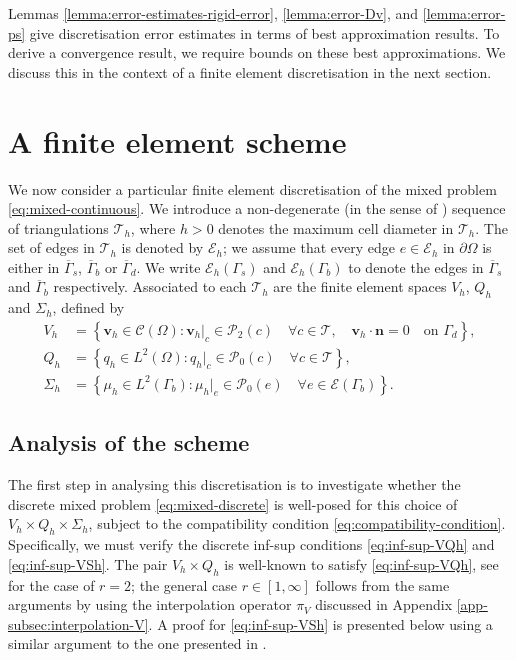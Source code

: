 \documentclass[onefignum,onetabnum]{siamart190516}
\newcommand{\bn}{\boldsymbol{n}}
\newcommand{\bv}{\boldsymbol{v}}
\newcommand{\bCc}{\boldsymbol{\mathcal{C}}}
\newcommand{\Ec}{\mathcal{E}}
\newcommand{\bPc}{\boldsymbol{\mathcal{P}}}
\newcommand{\Pc}{\mathcal{P}}
\newcommand{\Tc}{\mathcal{T}}
\begin{document}
        Lemmas \ref{lemma:error-estimates-rigid-error}, \ref{lemma:error-Dv}, and \ref{lemma:error-ps} give discretisation error estimates in terms of best approximation results. To derive a convergence result, we require bounds on these best approximations. We discuss this in the context of a finite element discretisation in the next section.

		
\section{A finite element scheme}\label{sec:fe-scheme}

We now consider a particular finite element discretisation of the mixed problem \eqref{eq:mixed-continuous}. We introduce a non-degenerate (in the sense of \cite[Definition 4.4.13]{brenner2007}) sequence of triangulations $\Tc_h$, where $h>0$ denotes the maximum cell diameter in $\Tc_h$. The set of edges in $\Tc_h$ is denoted by $\Ec_h$; we assume that every edge $e\in \Ec_h$ in $\partial\Omega$ is either in $\overline{\Gamma}_s$, $\overline{\Gamma}_b$ or $\overline{\Gamma}_d$. We write $\Ec_h(\Gamma_s)$ and $\Ec_h(\Gamma_b)$ to denote the edges in $\overline{\Gamma}_s$ and $\overline{\Gamma}_b$ respectively. Associated to each $\Tc_h$ are the finite element spaces $V_h$, $Q_h$ and $\Sigma_h$, defined by
%
\begin{subequations}\label{eq:fem-spaces}
	\begin{align}
		V_h &= \left\lbrace \bv_h\in \bCc(\Omega) : \bv_h |_c \in \bPc_2(c) \quad \forall c \in\Tc, \quad \bv_h\cdot\bn = 0 \quad \text{on $\Gamma_d$} \right\rbrace, \label{eq:Vh}\\
		Q_h &= \left\lbrace q_h\in L^2(\Omega) : q_h|_c \in \Pc_0(c) \quad \forall c \in \Tc \right\rbrace, \label{eq:Qh}\\
		\Sigma_h &= \left\lbrace \mu_h\in L^2(\Gamma_b) : \mu_h|_e \in \Pc_0(e) \quad \forall e \in \Ec(\Gamma_b) \right\rbrace. \label{eq:Sh}
	\end{align}
\end{subequations}

\subsection{Analysis of the scheme}

The first step in analysing this discretisation is to investigate whether the discrete mixed problem \eqref{eq:mixed-discrete} is well-posed for this choice of $V_h\times Q_h\times \Sigma_h$, subject to the compatibility condition \eqref{eq:compatibility-condition}. Specifically, we must verify the discrete inf-sup conditions \eqref{eq:inf-sup-VQh} and \eqref{eq:inf-sup-VSh}. The pair $V_h\times Q_h$ is well-known to satisfy \eqref{eq:inf-sup-VQh}, see \cite[Proposition 8.4.3]{boffi2013} for the case of $r=2$; the general case $r \in [1,\infty]$ follows from the same arguments by using the interpolation operator $\pi_V$ discussed in Appendix \ref{app-subsec:interpolation-V}. A proof for \eqref{eq:inf-sup-VSh} is presented below using a similar argument to the one presented in \cite[Proposition 3.3]{coorevits2002}.
\end{document}
